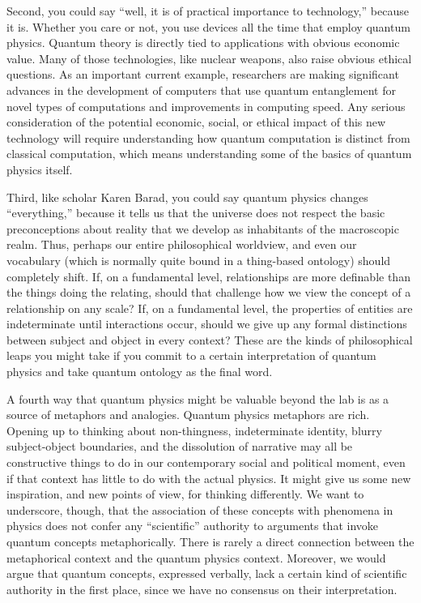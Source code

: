 \documentclass[12pt,onecolumn,preprintnumbers,amsmath,amssymbn,reprint,nofootinbib,superscriptaddress]{revtex4}    %
\begin{document}

Second, you could say ``well, it is of practical importance to technology,'' because it is.  Whether you care or not, you use devices all the time that employ quantum physics.  Quantum theory is directly tied to applications with obvious economic value.  Many of those technologies, like nuclear weapons, also raise obvious ethical questions.  As an important current example, researchers are making significant advances in the development of computers that use quantum entanglement for novel types of computations and improvements in computing speed. Any serious consideration of the potential economic, social, or ethical impact of this new technology will require understanding  how quantum computation is distinct from classical computation, which means understanding some of the basics of quantum physics itself.  

Third, like scholar Karen Barad, you could say quantum physics changes ``everything,'' because it tells us that the universe does not respect the basic preconceptions about reality that we develop as inhabitants of the macroscopic realm.  Thus, perhaps our entire philosophical worldview, and even our vocabulary (which is normally quite bound in a thing-based ontology) should completely shift.  If, on a fundamental level, relationships are more definable than the things doing the relating, should that challenge how we view the concept of a relationship on any scale?  If, on a fundamental level, the properties of entities are indeterminate until interactions occur, should we give up any formal distinctions between subject and object in every context?  These are the kinds of philosophical leaps you might take if you commit to a certain interpretation of quantum physics and take quantum ontology as the final word.  

A fourth way that quantum physics might be valuable beyond the lab is as a source of metaphors and analogies. Quantum physics metaphors are rich. Opening up to thinking about non-thingness, indeterminate identity, blurry subject-object boundaries, and the dissolution of narrative may all be constructive things to do in our contemporary social and political moment, even if that context has little to do with the actual physics.  It might give us some new inspiration, and new points of view, for thinking differently. We want to underscore, though, that the association of these concepts with phenomena in physics does not confer any ``scientific'' authority to arguments that invoke quantum concepts metaphorically.  There is rarely a direct connection between the metaphorical context and the quantum physics context.  Moreover, we would argue that quantum concepts, expressed verbally, lack a certain kind of scientific authority in the first place, since we have no consensus on their interpretation.
\end{document}

